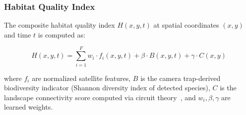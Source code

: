 \subsubsection{Habitat Quality Index}

The composite habitat quality index $H(x, y, t)$ at spatial coordinates $(x, y)$ and time $t$ is computed as:

\begin{equation}
H(x, y, t) = \sum_{i=1}^{F} w_i \cdot f_i(x, y, t) + \beta \cdot B(x, y, t) + \gamma \cdot C(x, y)
\end{equation}

where $f_i$ are normalized satellite features, $B$ is the camera trap-derived biodiversity indicator (Shannon diversity index of detected species), $C$ is the landscape connectivity score computed via circuit theory~\cite{mcrae2008}, and $w_i, \beta, \gamma$ are learned weights.

